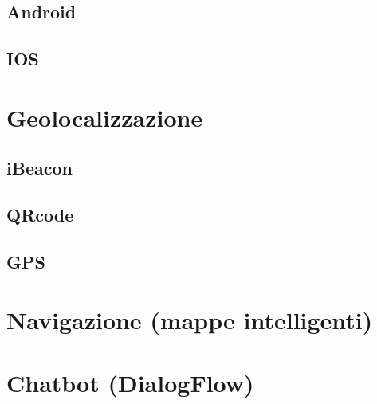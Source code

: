 \subsection{Android}
\subsection{IOS}
\section{Geolocalizzazione}
\subsection{iBeacon}
\subsection{QRcode}
\subsection{GPS}
\section{Navigazione (mappe intelligenti)}
\section{Chatbot (DialogFlow)}
